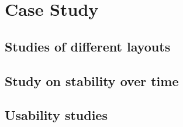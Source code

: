 \chapter{Case Study}

\section{Studies of different layouts}

\section{Study on stability over time}

\section{Usability studies}
